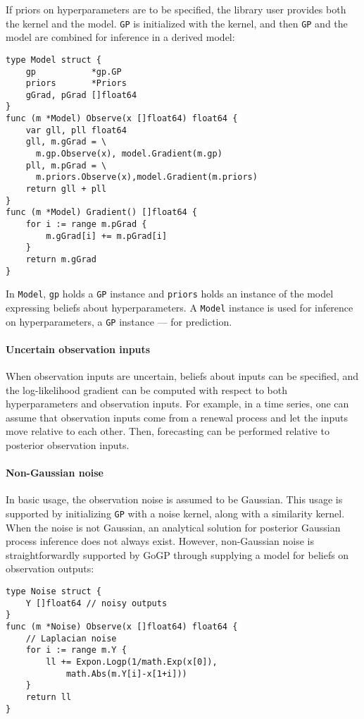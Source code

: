 \documentclass[sigplan,review]{acmart}\settopmatter{printfolios=true,printccs=false,printacmref=false}
\begin{document}
If priors on hyperparameters are to be specified, the library
user provides both the kernel and the model.  \lstinline{GP} is
initialized with the kernel, and then \lstinline{GP} and the
model are combined for inference in a derived model:
\begin{lstlisting}
type Model struct {
    gp           *gp.GP
    priors       *Priors
    gGrad, pGrad []float64
}
func (m *Model) Observe(x []float64) float64 {
    var gll, pll float64
    gll, m.gGrad = \
      m.gp.Observe(x), model.Gradient(m.gp)
    pll, m.pGrad = \
      m.priors.Observe(x),model.Gradient(m.priors)
    return gll + pll
}
func (m *Model) Gradient() []float64 {
	for i := range m.pGrad {
		m.gGrad[i] += m.pGrad[i]
	}
	return m.gGrad
}
\end{lstlisting}
In \lstinline{Model}, \lstinline{gp} holds a \lstinline{GP}
instance and \lstinline{priors} holds an instance of the model
expressing beliefs about hyperparameters. A \lstinline{Model}
instance is used for inference on hyperparameters, a
\lstinline{GP} instance --- for prediction.

\paragraph{Uncertain observation inputs}

When observation inputs are uncertain, beliefs about inputs can
be specified, and the log-likelihood gradient can be computed
with respect to both hyperparameters and observation inputs. For
example, in a time series, one can assume that observation
inputs come from a renewal process and let the inputs move 
relative to each other. Then, forecasting can be performed 
relative to posterior observation inputs.

\paragraph{Non-Gaussian noise}

In basic usage, the observation noise is assumed to be Gaussian.
This usage is supported by initializing \lstinline{GP} with a noise
kernel, along with a similarity kernel. When the noise is not
Gaussian, an analytical solution for posterior Gaussian process
inference does not always exist. However, non-Gaussian noise is
straightforwardly supported by GoGP through supplying a
model for beliefs on observation outputs:
\begin{lstlisting}
type Noise struct {
	Y []float64 // noisy outputs
}
func (m *Noise) Observe(x []float64) float64 {
	// Laplacian noise
	for i := range m.Y {
		ll += Expon.Logp(1/math.Exp(x[0]),
			math.Abs(m.Y[i]-x[1+i]))
	}
	return ll
}
\end{lstlisting}



\end{document}
